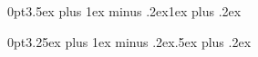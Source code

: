 \titlespacing*{\section} {0pt}{3.5ex plus 1ex minus .2ex}{1ex plus .2ex}	

\titlespacing*{\subsection} {0pt}{3.25ex plus 1ex minus .2ex}{.5ex plus .2ex}



